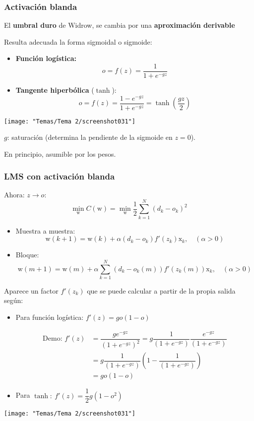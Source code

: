 \subsubsection{Activación blanda}
El \textbf{umbral duro} de Widrow, se cambia por una \textbf{aproximación derivable}

Resulta adecuada la forma sigmoidal o sigmoide:

\begin{minipage}{0.5\textwidth}
	\begin{itemize}
		\item \textbf{Función logística:} \[ o=f(z)=\dfrac{1}{1+e^{-gz}} \]
		\item \textbf{Tangente hiperbólica} ($\tanh$): \[ o=f(z)=\dfrac{1-e^{-gz}}{1+e^{-gz}}=\tanh\left(\dfrac{gz}{2}\right) \]
	\end{itemize}
\end{minipage}\qquad\begin{minipage}{0.5\textwidth}
\begin{center}
	\texttt{[image: "Temas/Tema 2/screenshot031"]}
\end{center}
\end{minipage}

$g$: saturación (determina la pendiente de la sigmoide en $z=0$).

En principio, asumible por los pesos.
\subsubsection{LMS con activación blanda}
Ahora: $z\to o$: \[ \min_{\mathrm{w}}C(\mathrm{w})=\min_{\mathrm{w}}\dfrac{1}{2}\sum_{k=1}^{N}(d_k-o_k)^2 \]
\begin{itemize}
	\item Muestra a muestra: \[ \mathrm{w}(k+1)=\mathrm{w}(k)+\alpha(d_k-o_k)f'(z_k)\mathrm{x}_k,\quad(\alpha>0) \]
	\item Bloque: \[ \mathrm{w}(m+1)=\mathrm{w}(m)+\alpha\sum_{k=1}^{N}(d_k-o_k(m))f'(z_k(m))\mathrm{x}_k,\quad(\alpha>0) \]
\end{itemize}
Aparece un factor $f'(z_k)$ que se puede calcular a partir de la propia salida según:

\begin{minipage}{0.5\textwidth}
	\begin{itemize}
		\item Para función logística: $f'(z)=go(1-o)$
	
	\[ \begin{aligned}
		\text{Demo: }f'(z)&=\dfrac{ge^{-gz}}{(1+e^{-gz})^2}=g\dfrac{1}{(1+e^{-gz})}\dfrac{e^{-gz}}{(1+e^{-gz})}\\
		&=g\dfrac{1}{(1+e^{-gz})}\left(1-\dfrac{1}{(1+e^{-gz})}\right)\\
		&=go(1-o)
	\end{aligned} \]
	\item Para $\tanh:\:f'(z)=\dfrac{1}{2}g(1-o^2)$
	\end{itemize}
\end{minipage}\qquad\begin{minipage}{0.5\textwidth}
\begin{center}
	\texttt{[image: "Temas/Tema 2/screenshot031"]}
\end{center}
\end{minipage}
